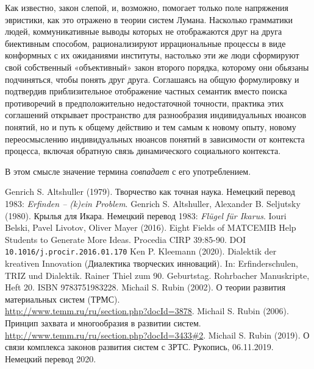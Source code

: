 \documentclass[a4paper,11pt]{article}
\begin{document}
Как известно, закон слепой, и, возможно, помогает только поле напряжения
эвристики, как это отражено в теории систем Лумана.  Насколько грамматики
людей, коммуникативные выводы которых не отображаются друг на друга биективным
способом, рационализируют иррациональные процессы в виде конформных с их
ожиданиями институты, настолько эти же люди сформируют свой собственный
«объективный» закон второго порядка, которому они обьязаны подчиняться, чтобы
понять друг друга. Соглашаясь на общую формулировку и подтвердив
приблизительное отображение частных семантик вместо поиска противоречий в
предположительно недостаточной точности, практика этих соглашений открывает
пространство для разнообразия индивидуальных нюансов понятий, но и путь к
общему действию и тем самым к новому опыту, новому переосмыслению
индивидуальных нюансов понятий в зависимости от контекста процесса, включая
обратную связь динамического социального контекста. 

В этом смысле значение термина \emph{совпадает} с его употреблением.

\begin{thebibliography}{yyy}
 Genrich S. Altshuller (1979).  Творчество как
  точная наука.  Немецкий перевод 1983: \emph{Erfinden -- (k)ein Problem}.
 Genrich S. Altshuller, Alexander B. Seljutsky
  (1980). Крылья для Икара. Немецкий перевод 1983: \emph{Flügel für Ikarus}.
 Iouri Belski, Pavel Livotov, Oliver Mayer (2016). Eight
  Fields of MATCEMIB Help Students to Generate More Ideas. Procedia CIRP
  39:85-90.  DOI \texttt{10.1016/j.procir.2016.01.170}
 Ken P. Kleemann (2020). Dialektik der kreativen
  Innovation (Диалектика творческих инноваций).  In: Erfinderschulen, TRIZ und
  Dialektik. Rainer Thiel zum 90. Geburtstag.  Rohrbacher Manuskripte, Heft
  20. ISBN 9783751983228.
 Michail S. Rubin (2002).  О теории развития материальных
  систем (ТРМС). \\ \url{http://www.temm.ru/ru/section.php?docId=3878}.
 Michail S. Rubin (2006). Принцип захвата и многообразия в
  развитии систем.\\ \url{http://www.temm.ru/ru/section.php?docId=3433#2}.
 Michail S. Rubin (2019).  О связи комплекса законов
  развития систем с ЗРТС.  Рукопись, 06.11.2019. Немецкий перевод 2020.
\end{thebibliography}
\end{document}

